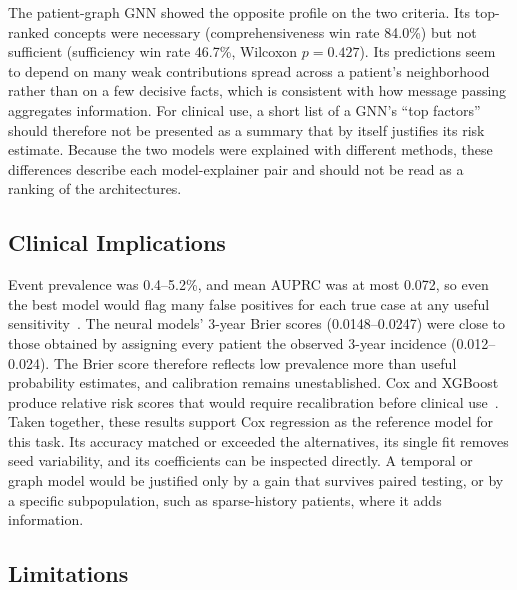 The patient-graph GNN showed the opposite profile on the two criteria. Its top-ranked concepts were necessary (comprehensiveness win rate 84.0\%) but not sufficient (sufficiency win rate 46.7\%, Wilcoxon $p=0.427$). Its predictions seem to depend on many weak contributions spread across a patient's neighborhood rather than on a few decisive facts, which is consistent with how message passing aggregates information. For clinical use, a short list of a GNN's ``top factors'' should therefore not be presented as a summary that by itself justifies its risk estimate. Because the two models were explained with different methods, these differences describe each model-explainer pair and should not be read as a ranking of the architectures.

\subsection{Clinical Implications}
\label{sec:disc-clinical}

Event prevalence was 0.4--5.2\%, and mean AUPRC was at most 0.072, so even the best model would flag many false positives for each true case at any useful sensitivity~\cite{saito2015precision}. The neural models' 3-year Brier scores (0.0148--0.0247) were close to those obtained by assigning every patient the observed 3-year incidence (0.012--0.024). The Brier score therefore reflects low prevalence more than useful probability estimates, and calibration remains unestablished. Cox and XGBoost produce relative risk scores that would require recalibration before clinical use~\cite{vancalster2019calibration}.
Taken together, these results support Cox regression as the reference model for this task. Its accuracy matched or exceeded the alternatives, its single fit removes seed variability, and its coefficients can be inspected directly. A temporal or graph model would be justified only by a gain that survives paired testing, or by a specific subpopulation, such as sparse-history patients, where it adds information.

\subsection{Limitations}
\label{sec:disc-limitations}

